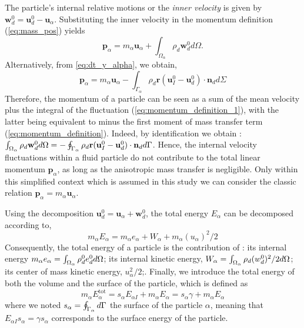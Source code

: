 The particle's internal relative motions or the \textit{inner velocity} is given by $\textbf{w}_d^0 = \textbf{u}_d^0 - \textbf{u}_\alpha$. 
Substituting the inner velocity in the momentum definition (\ref{eq:mass_pos}) yields
\begin{equation}
    \label{eq:momentum_definition_1}
    \textbf{p}_\alpha
    = m_\alpha \textbf{u}_\alpha
    + \int_{\Omega_\alpha} \rho_d \textbf{w}_d^0 d\Omega.
\end{equation}
Alternatively, from \eqref{eq:dt_y_alpha}, we obtain,
\begin{equation}
    \textbf{p}_\alpha
    =  m_\alpha \textbf{u}_\alpha
    - \int_{\Gamma_\alpha} \rho_d\textbf{r}(\textbf{u}_I^0 - \textbf{u}_d^0)\cdot \textbf{n}_d d\Sigma
    \label{eq:momentum_definition}
\end{equation}
Therefore, the momentum of a particle can be seen as a sum of the mean velocity plus the integral of the fluctuation (\ref{eq:momentum_definition_1}), with the latter being equivalent to minus the first moment of mass transfer term (\ref{eq:momentum_definition}).
Indeed, by identification we obtain : $\int_{\Omega_{\alpha}}  \rho_d \textbf{w}_d^0  d\Omega = - \oint_{\Gamma_{\alpha}}   \rho_d\textbf{r} (\textbf{u}_I^0 - \textbf{u}_d^0)\cdot \textbf{n}_d  d\Gamma$. 
Hence, the internal velocity fluctuations within a fluid particle do not contribute to the total linear momentum $\textbf{p}_\alpha$, as long as the anisotropic mass transfer is negligible.  
Only within this simplified context which is assumed in this study we can consider the classic relation $\textbf{p}_\alpha = m_\alpha \textbf{u}_\alpha$. 


Using the decomposition $\textbf{u}_d^0 = \textbf{u}_\alpha + \textbf{w}_d^0$, the total energy $E_\alpha$ can be decomposed according to,
\begin{equation*}
    \label{eq:E_alpha_def}
    m_\alpha E_\alpha
    = m_\alpha e_\alpha 
    + W_\alpha
    + m_\alpha (u_\alpha)^2/2
\end{equation*}
Consequently, the total energy of a particle is the contribution of :
its internal energy $m_\alpha e_\alpha = \int_{\Omega_{\alpha}} \rho_d^0 e_d^0 d\Omega$; 
its internal kinetic energy, $W_\alpha =  \int_{\Omega_{\alpha}} \rho_d  (w_d^0)^2/2  d\Omega$;
its center of mass kinetic energy, $u_\alpha^2/2$;. 
Finally, we introduce the total energy of both the volume and the surface of the particle, which is defined as 
\begin{equation*}
    m_\alpha E_\alpha^\text{tot}
    = 
    s_\alpha  E_{\alpha I}
    + m_\alpha E_\alpha
    = 
    s_\alpha \gamma 
    + m_\alpha E_\alpha
\end{equation*}
where we noted $s_\alpha = \oint_{\Gamma_{\alpha}}  d\Gamma$ the surface of the particle $\alpha$, meaning that $E_{\alpha I} s_\alpha = \gamma s_\alpha $ corresponds to the surface energy of the particle. 


